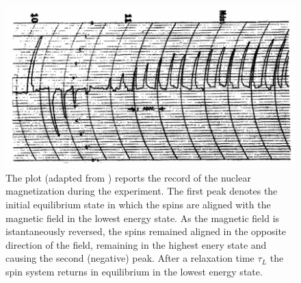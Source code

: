 \begin{figure}[htbp]
    \centering 
    \includegraphics[scale=0.5]{./images/PurcellPound.png}
    \caption{The plot (adapted from \cite{PandP}) reports the record of the nuclear magnetization during the experiment. The first peak denotes
    the initial equilibrium state in which the spins are aligned with the magnetic field in the lowest energy state. As the magnetic field is istantaneously reversed,
    the spins remained aligned in the opposite direction of the field, remaining in the highest enery state and causing the second (negative) peak. After a relaxation time
    $\tau_L$ the spin system returns in equilibrium in the lowest energy state.}
    \label{fig:PandP}
\end{figure}